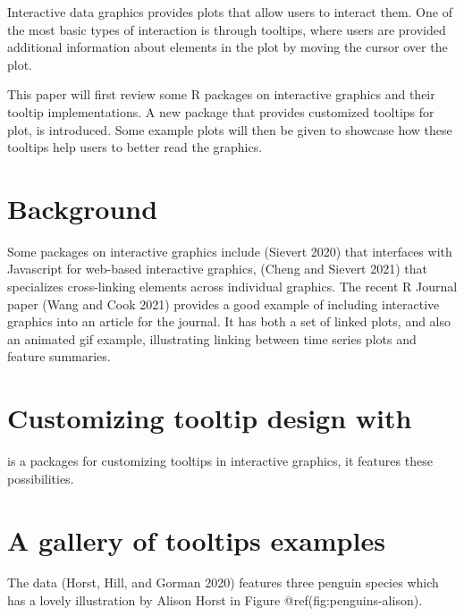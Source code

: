 Interactive data graphics provides plots that allow users to interact them. One of the most basic types of interaction is through tooltips, where users are provided additional information about elements in the plot by moving the cursor over the plot.

This paper will first review some R packages on interactive graphics and their tooltip implementations. A new package  that provides customized tooltips for plot, is introduced. Some example plots will then be given to showcase how these tooltips help users to better read the graphics.

\hypertarget{background-1}{%
\section{Background}\label{background-1}}

Some packages on interactive graphics include  (Sievert 2020) that interfaces with Javascript for web-based interactive graphics,  (Cheng and Sievert 2021) that specializes cross-linking elements across individual graphics. The recent R Journal paper  (Wang and Cook 2021) provides a good example of including interactive graphics into an article for the journal. It has both a set of linked plots, and also an animated gif example, illustrating linking between time series plots and feature summaries.

\hypertarget{customizing-tooltip-design-with}{%
\section{\texorpdfstring{Customizing tooltip design with }{Customizing tooltip design with }}\label{customizing-tooltip-design-with}}

 is a packages for customizing tooltips in interactive graphics, it features these possibilities.

\hypertarget{a-gallery-of-tooltips-examples}{%
\section{A gallery of tooltips examples}\label{a-gallery-of-tooltips-examples}}

The  data (Horst, Hill, and Gorman 2020) features three penguin species which has a lovely illustration by Alison Horst in Figure @ref(fig:penguins-alison).

